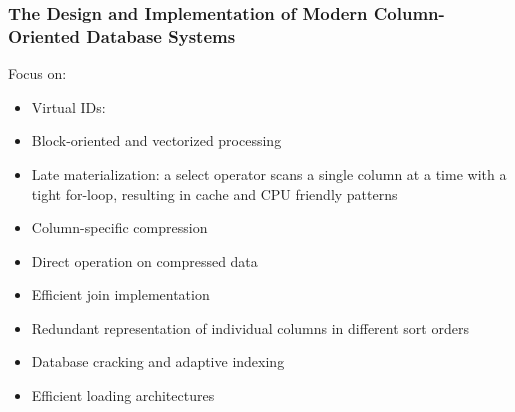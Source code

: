 \documentclass[11pt]{article}
\begin{document}
\subsubsection{The Design and Implementation of Modern Column-Oriented Database Systems}
\label{sec:orged20d4f}
Focus on:
\begin{itemize}
\item Virtual IDs:
\item Block-oriented and vectorized processing
\item Late materialization: a select operator scans a single column at a time with a tight for-loop, resulting
in cache and CPU friendly patterns
\item Column-specific compression
\item Direct operation on compressed data
\item Efficient join implementation
\item Redundant representation of individual columns in different sort orders
\item Database cracking and adaptive indexing
\item Efficient loading architectures
\end{itemize}
\end{document}
